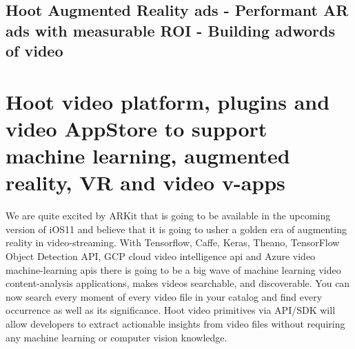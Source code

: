 \documentclass{article}
\begin{document}
%
\subsection{Hoot Augmented Reality ads - Performant AR ads with
  measurable ROI - Building adwords of video }



\section{Hoot video platform, plugins and video AppStore to support machine learning,
  augmented reality, VR and video v-apps}
We are quite excited by ARKit that is going to be available in the
upcoming version of iOS11 and believe that it is going to usher a
golden era of augmenting reality in video-streaming. With Tensorflow,
Caffe, Keras, Theano, TensorFlow Object Detection API, GCP cloud
video intelligence api and Azure video machine-learning apis there is going to be a
big wave of machine learning video content-analysis applications,
makes videos searchable, and discoverable. You can now search every
moment of every video file in your catalog and find every occurrence
as well as its significance. Hoot video primitives via API/SDK will allow developers to extract
actionable insights from video files without requiring any machine
learning or computer vision knowledge. 
\end{document}
